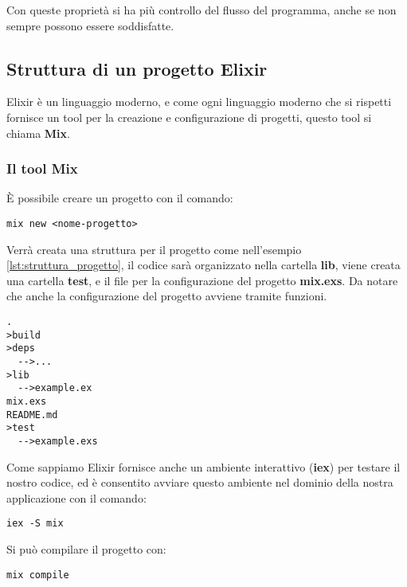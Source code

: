 Con queste proprietà si ha più controllo del flusso del programma,
anche se non sempre possono essere soddisfatte.


\subsection{Struttura di un progetto Elixir}

Elixir è un linguaggio moderno, e come ogni linguaggio moderno che
si rispetti fornisce un tool per la creazione e configurazione di
progetti, questo tool si chiama \textbf{Mix}.


\subsubsection{Il tool Mix}
È possibile creare un progetto con il comando:

\begin{lstlisting}[language=none]
mix new <nome-progetto>
\end{lstlisting}

Verrà creata una struttura per il progetto come nell'esempio \ref{lst:struttura_progetto},
il codice sarà organizzato nella cartella \textbf{lib}, viene creata una
cartella \textbf{test}, e il file per la configurazione del progetto \textbf{mix.exs}.
Da notare che anche la configurazione del progetto avviene tramite funzioni.

\begin{lstlisting}[language=none,captionpos=b,caption={Struttura progetto},label={lst:struttura_progetto}]
.
>build
>deps
  -->...
>lib
  -->example.ex
mix.exs
README.md
>test
  -->example.exs
\end{lstlisting}

Come sappiamo Elixir fornisce anche un ambiente interattivo (\textbf{iex}) per
testare il nostro codice, ed è consentito avviare questo ambiente nel
dominio della nostra applicazione con il comando:

\begin{lstlisting}[language=none]
iex -S mix 
\end{lstlisting}
Si può compilare il progetto con:
\begin{lstlisting}[language=none]
mix compile
\end{lstlisting}

